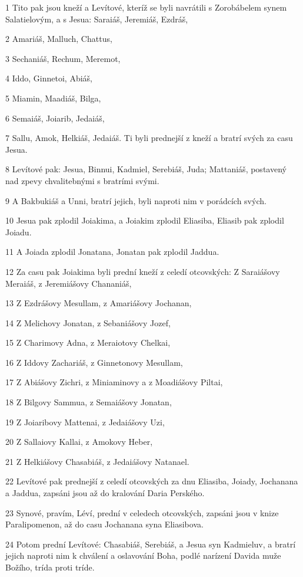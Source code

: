 \par 1 Tito pak jsou kneží a Levítové, kteríž se byli navrátili s Zorobábelem synem Salatielovým, a s Jesua: Saraiáš, Jeremiáš, Ezdráš,
\par 2 Amariáš, Malluch, Chattus,
\par 3 Sechaniáš, Rechum, Meremot,
\par 4 Iddo, Ginnetoi, Abiáš,
\par 5 Miamin, Maadiáš, Bilga,
\par 6 Semaiáš, Joiarib, Jedaiáš,
\par 7 Sallu, Amok, Helkiáš, Jedaiáš. Ti byli prednejší z kneží a bratrí svých za casu Jesua.
\par 8 Levítové pak: Jesua, Binnui, Kadmiel, Serebiáš, Juda; Mattaniáš, postavený nad zpevy chvalitebnými s bratrími svými.
\par 9 A Bakbukiáš a Unni, bratrí jejich, byli naproti nim v porádcích svých.
\par 10 Jesua pak zplodil Joiakima, a Joiakim zplodil Eliasiba, Eliasib pak zplodil Joiadu.
\par 11 A Joiada zplodil Jonatana, Jonatan pak zplodil Jaddua.
\par 12 Za casu pak Joiakima byli prední kneží z celedí otcovských: Z Saraiášovy Meraiáš, z Jeremiášovy Chananiáš,
\par 13 Z Ezdrášovy Mesullam, z Amariášovy Jochanan,
\par 14 Z Melichovy Jonatan, z Sebaniášovy Jozef,
\par 15 Z Charimovy Adna, z Meraiotovy Chelkai,
\par 16 Z Iddovy Zachariáš, z Ginnetonovy Mesullam,
\par 17 Z Abiášovy Zichri, z Miniaminovy a z Moadiášovy Piltai,
\par 18 Z Bilgovy Sammua, z Semaiášovy Jonatan,
\par 19 Z Joiaribovy Mattenai, z Jedaiášovy Uzi,
\par 20 Z Sallaiovy Kallai, z Amokovy Heber,
\par 21 Z Helkiášovy Chasabiáš, z Jedaiášovy Natanael.
\par 22 Levítové pak prednejší z celedí otcovských za dnu Eliasiba, Joiady, Jochanana a Jaddua, zapsáni jsou až do kralování Daria Perského.
\par 23 Synové, pravím, Léví, prední v celedech otcovských, zapsáni jsou v knize Paralipomenon, až do casu Jochanana syna Eliasibova.
\par 24 Potom prední Levítové: Chasabiáš, Serebiáš, a Jesua syn Kadmieluv, a bratrí jejich naproti nim k chválení a oslavování Boha, podlé narízení Davida muže Božího, trída proti tríde.
